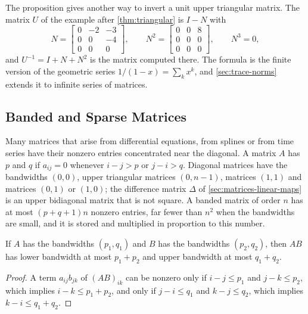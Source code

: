The proposition gives another way to invert a unit upper triangular matrix. The matrix $U$ of the example after \cref{thm:triangular} is $I-N$ with
\[
N=\begin{bmatrix}0&-2&-3\\0&0&-4\\0&0&0\end{bmatrix},\qquad N^2=\begin{bmatrix}0&0&8\\0&0&0\\0&0&0\end{bmatrix},\qquad N^3=0,
\]
and $U^{-1}=I+N+N^2$ is the matrix computed there. The formula is the finite version of the geometric series $1/(1-x)=\sum_kx^k$, and \cref{sec:trace-norms} extends it to infinite series of matrices.

\subsection{Banded and Sparse Matrices}

Many matrices that arise from differential equations, from splines or from time series have their nonzero entries concentrated near the diagonal. A matrix $A$ has  $p$ and  $q$ if $a_{ij}=0$ whenever $i-j>p$ or $j-i>q$. Diagonal matrices have the bandwidths $(0,0)$, upper triangular matrices $(0,n-1)$,  matrices $(1,1)$ and  matrices $(0,1)$ or $(1,0)$; the difference matrix $\Delta$ of \cref{sec:matrices-linear-maps} is an upper bidiagonal matrix that is not square. A banded matrix of order $n$ has at most $(p+q+1)n$ nonzero entries, far fewer than $n^2$ when the bandwidths are small, and it is stored and multiplied in proportion to this number.

\begin{proposition}
\label{prop:band-product}
If $A$ has the bandwidths $(p_1,q_1)$ and $B$ has the bandwidths $(p_2,q_2)$, then $AB$ has lower bandwidth at most $p_1+p_2$ and upper bandwidth at most $q_1+q_2$.
\end{proposition}

\begin{proof}
A term $a_{ij}b_{jk}$ of $(AB)_{ik}$ can be nonzero only if $i-j\le p_1$ and $j-k\le p_2$, which implies $i-k\le p_1+p_2$, and only if $j-i\le q_1$ and $k-j\le q_2$, which implies $k-i\le q_1+q_2$.
\end{proof}

